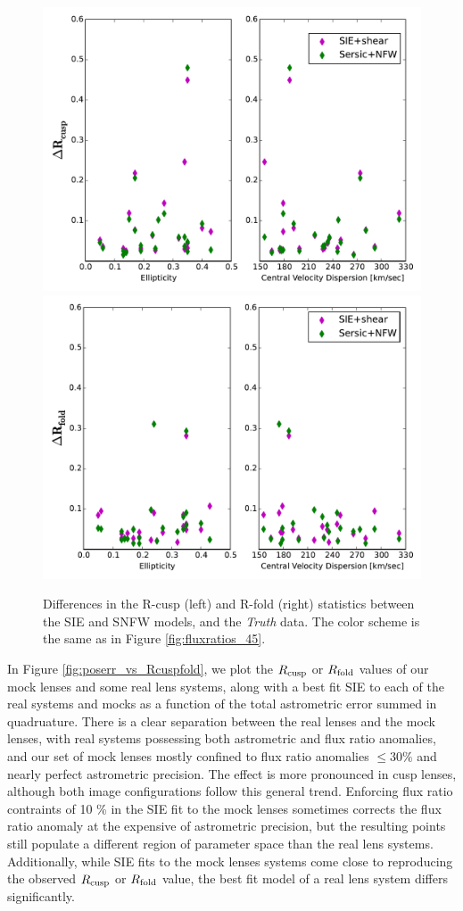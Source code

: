 \begin{figure}
	{\includegraphics[trim=0cm 0.2cm 0cm 0.2cm,clip,width=.48\textwidth]{./figures_sls/EllipVdis_vs_Rcusp-eps-converted-to.pdf}}
	{\includegraphics[trim=0cm 0.2cm 0cm 0.2cm,clip,width=.48\textwidth]{./figures_sls/EllipVdis_vs_Rfold-eps-converted-to.pdf}} 
	\caption{\label{fig:Rcuspfold_plot}Differences in the R-cusp (left) and R-fold (right) statistics between the SIE and SNFW models, and the \textit{Truth} data. The color scheme is the same as in Figure \ref{fig:fluxratios_45}.}
\end{figure}
\newline \indent In Figure \ref{fig:poserr_vs_Rcuspfold}, we plot the $R_{\rm{cusp}}$ or $R_{\rm{fold}}$ values of our mock lenses and some real lens systems, along with a best fit SIE to each of the real systems and mocks as a function of the total astrometric error summed in quadruature. There is a clear separation between the real lenses and the mock lenses, with real systems possessing both astrometric and flux ratio anomalies, and our set of mock lenses mostly confined to flux ratio anomalies $\leq 30 \%$ and nearly perfect astrometric precision. The effect is more pronounced in cusp lenses, although both image configurations follow this general trend. Enforcing flux ratio contraints of 10 \% in the SIE fit to the mock lenses sometimes corrects the flux ratio anomaly at the expensive of astrometric precision, but the resulting points still populate a different region of parameter space than the real lens systems. Additionally, while SIE fits to the mock lenses systems come close to reproducing the observed $R_{\rm{cusp}}$ or $R_{\rm{fold}}$ value, the best fit model of a real lens system differs significantly.
